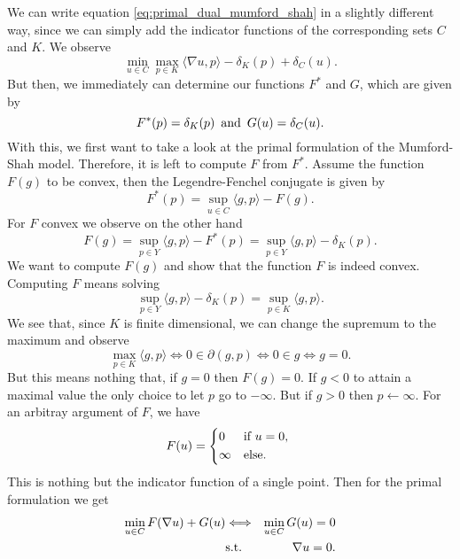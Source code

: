 	We can write equation \ref{eq:primal_dual_mumford_shah} in a slightly different way, since we can simply add the indicator functions of the corresponding sets $C$ and $K$. We observe
		\begin{equation}
			\min_{u \in C} \max_{p \in K} \langle \nabla u, p \rangle - \delta_{K}(p) + \delta_{C}(u).
			\label{eq:primal_dual_mumford_shah_complete}
		\end{equation}
	But then, we immediately can determine our functions $F^{\ast}$ and $G$, which are given by
		$$
			F^{\ast}(p) = \delta_{K}(p) \,\,\, \textnormal{and} \,\,\, G(u) = \delta_{C}(u).
		$$
    With this, we first want to take a look at the primal formulation of the Mumford-Shah model. Therefore, it is left to compute $F$ from $F^{\ast}$. Assume the function $F(g)$ to be convex, then the Legendre-Fenchel conjugate is given by
        $$
            F^{\ast}(p) = \sup_{u \in C} \langle g, p \rangle - F(g).
        $$
    For $F$ convex we observe on the other hand
        $$
            F(g) = \sup_{p \in Y} \langle g, p \rangle - F^{\ast}(p) = \sup_{p \in Y} \langle g, p \rangle - \delta_{K}(p).
        $$
    We want to compute $F(g)$ and show that the function $F$ is indeed convex. Computing $F$ means solving
        $$
            \sup_{p \in Y} \langle g, p \rangle - \delta_{K}(p) = \sup_{p \in K} \langle g, p \rangle.
        $$
    We see that, since $K$ is finite dimensional, we can change the supremum to the maximum and observe
        $$
            \max_{p \in K} \langle g, p \rangle \Longleftrightarrow 0 \in \partial \left( g, p \right) \Longleftrightarrow 0 \in g \Longleftrightarrow g = 0.
        $$
    But this means nothing that, if $g = 0$ then $F(g) = 0$. If $g < 0$ to attain a maximal value the only choice to let $p$ go to $- \infty$. But if $g > 0$ then $p \longleftarrow \infty$. For an arbitray argument of $F$, we have
        $$
            F(u) =
                \begin{dcases*}
                    0 & \textnormal{if $u = 0$,} \\
                    \infty & \textnormal{else.}
                \end{dcases*}
        $$
    This is nothing but the indicator function of a single point. Then for the primal formulation we get
        \begin{eqnarray}
            \min_{u \in C} F(\nabla u) + G(u) &\Longleftrightarrow& \min_{u \in C} G(u) = 0\\
            &\textnormal{s.t.}& \,\,\, \nabla u = 0.
            \label{eq:primal_mumford_shah}
        \end{eqnarray}

